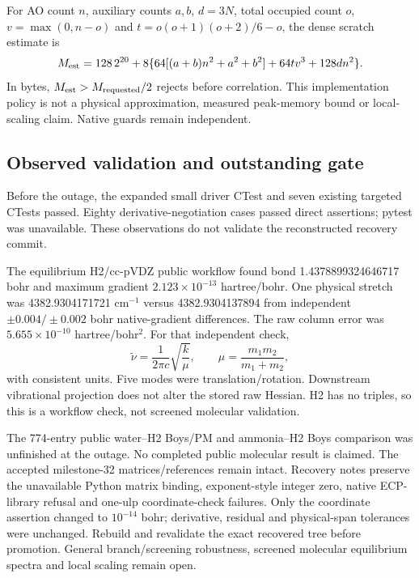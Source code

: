 \documentclass[11pt]{article}
\begin{document}
For AO count $n$, auxiliary counts $a,b$, $d=3N$, total occupied count $o$,
$v=\max(0,n-o)$ and $t=o(o+1)(o+2)/6-o$, the dense scratch estimate is
\begin{equation}
 M_{\rm est}=128\,2^{20}
 +8\{64[(a+b)n^2+a^2+b^2]+64tv^3+128dn^2\}.
\end{equation}
In bytes, $M_{\rm est}>M_{\rm requested}/2$ rejects before correlation.
This implementation policy is not a physical approximation, measured
peak-memory bound or local-scaling claim. Native guards remain independent.

\subsection{Observed validation and outstanding gate}
Before the outage, the expanded small driver CTest and seven existing
targeted CTests passed. Eighty derivative-negotiation cases passed direct
assertions; pytest was unavailable. These observations do not validate the
reconstructed recovery commit.

The equilibrium H2/cc-pVDZ public workflow found bond 1.4378899324646717
bohr and maximum gradient $2.123\times10^{-13}$ hartree/bohr. One physical
stretch was 4382.9304171721 cm$^{-1}$ versus 4382.9304137894 from independent
$\pm0.004/\pm0.002$ bohr native-gradient differences. The raw column error
was $5.655\times10^{-10}$ hartree/bohr$^2$. For that independent check,
\begin{equation}
 \widetilde\nu=\frac{1}{2\pi c}\sqrt{\frac{k}{\mu}},\qquad
 \mu=\frac{m_1m_2}{m_1+m_2},
\end{equation}
with consistent units. Five modes were translation/rotation. Downstream
vibrational projection does not alter the stored raw Hessian. H2 has no
triples, so this is a workflow check, not screened molecular validation.

The 774-entry public water--H2 Boys/PM and ammonia--H2 Boys comparison was
unfinished at the outage. No completed public molecular result is claimed.
The accepted milestone-32 matrices/references remain intact. Recovery notes
preserve the unavailable Python matrix binding, exponent-style integer zero,
native ECP-library refusal and one-ulp coordinate-check failures. Only the
coordinate assertion changed to $10^{-14}$ bohr; derivative, residual and
physical-span tolerances were unchanged. Rebuild and revalidate the exact
recovered tree before promotion. General branch/screening robustness,
screened molecular equilibrium spectra and local scaling remain open.
\end{document}
